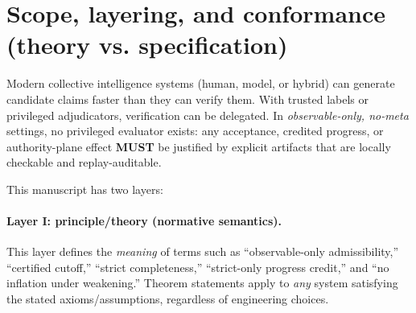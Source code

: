\documentclass[11pt]{article}
\newcommand{\MUST}{\textbf{MUST}}
\newcommand{\term}[1]{\emph{#1}}
\newcommand{\1}{\mathbf{1}}
\theoremstyle{definition}
\theoremstyle{plain}
\begin{document}
\begin{abstract}
Finally, we state conditional acceleration envelopes over spans of windows where observable premises hold (budget stability, utilization and strict-fraction lower bounds, and an empirically testable power-law upper bound on charged verification cost per admitted attempt as a function of cumulative committed strict progress). All premises and conclusions are expressed in locally observable, mechanically checkable quantities (certificates, inclusion/consistency proofs, index-membership proofs, receipts, caps, anchors, derivation rules, and bounded execution), without appeal to hidden ground truth.
Interpreting these envelopes as intelligence/capability acceleration additionally requires an epoch-defined semantic link between evidence and performance (semantic adequacy); otherwise the progress variable is only a strictly auditable counter.
All conclusions are conservative: under adversarial participation, missingness, or underspecified rules, the verifier is permitted to output \texttt{NONSTRICT} or \texttt{UNDEFINED}. Accordingly, the ``acceleration envelopes'' are conditional diagnostics that apply only to windows that pass the strict diagnostic gate; they do not claim that such windows must exist or persist in any external environment.
\end{abstract}

\section{Scope, layering, and conformance (theory vs. specification)}

Modern collective intelligence systems (human, model, or hybrid) can generate candidate claims faster than they can verify them. With trusted labels or privileged adjudicators, verification can be delegated. In \term{observable-only, no-meta} settings, no privileged evaluator exists: any acceptance, credited progress, or authority-plane effect \MUST{} be justified by explicit artifacts that are locally checkable and replay-auditable.

This manuscript has two layers:

\paragraph{Layer I: principle/theory (normative semantics).}
This layer defines the \emph{meaning} of terms such as ``observable-only admissibility,'' ``certified cutoff,'' ``strict completeness,'' ``strict-only progress credit,'' and ``no inflation under weakening.'' Theorem statements apply to \emph{any} system satisfying the stated axioms/assumptions, regardless of engineering choices.
\end{document}
